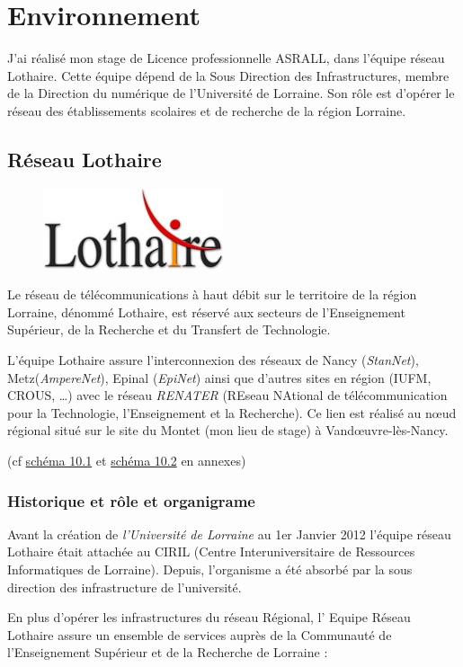 \documentclass[a4paper,12pt,one side,titlepage]{report}
\begin{document}
\chapter{Environnement}
J'ai réalisé mon stage de Licence professionnelle ASRALL, dans l'équipe réseau Lothaire.
Cette équipe dépend de la Sous Direction des Infrastructures, membre de la Direction 
du numérique de l'Université de Lorraine. Son rôle est d'opérer le réseau des 
établissements scolaires et de recherche de la région Lorraine.
\section{Réseau Lothaire}
\begin{figure}[H]
\center
\includegraphics{lothaire.jpg}
\end{figure}
Le réseau de télécommunications à haut débit sur le territoire de la région Lorraine, 
dénommé Lothaire, est réservé aux secteurs de l’Enseignement Supérieur, de la Recherche 
et du Transfert de Technologie. 

L'équipe Lothaire assure l’interconnexion des réseaux de Nancy (\emph{StanNet}), Metz(\emph{AmpereNet}), 
Epinal (\emph{EpiNet}) ainsi que d'autres sites en région (IUFM, CROUS, \ldots) avec le
réseau \emph{RENATER} (REseau NAtional de télécommunication pour la Technologie, l'Enseignement 
et la Recherche). Ce lien est réalisé au nœud régional situé sur le site du Montet 
(mon lieu de stage) à Vandœuvre-lès-Nancy.

(cf \hyperref[fig:imagereseaulothaire1]{schéma 10.1}  et \hyperref[fig:imagereseaulothaire1]{schéma 10.2} 
en annexes)

\subsection{Historique et rôle et organigrame}

Avant la création de \emph{l'Université de Lorraine} au 1er Janvier 2012 l'équipe 
réseau Lothaire était attachée au CIRIL (Centre Interuniversitaire de Ressources Informatiques
de Lorraine). Depuis, l'organisme a été absorbé par la sous direction des infrastructure
de l'université.

En plus d’opérer les infrastructures du réseau Régional, l’ Equipe Réseau Lothaire 
assure un ensemble de services auprès de la Communauté de l’Enseignement Supérieur 
et de la Recherche de Lorraine :
\end{document}
